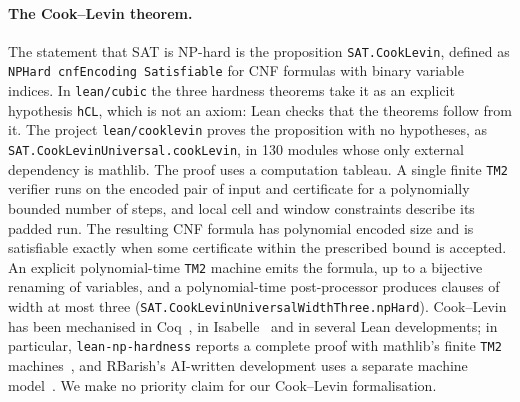 \documentclass[11pt,letterpaper]{article}
\theoremstyle{definition}
\theoremstyle{remark}
\newcommand{\lean}[1]{\texttt{#1}}
\begin{document}
\paragraph{The Cook--Levin theorem.}
The statement that SAT is NP-hard is the proposition \lean{SAT.CookLevin}, defined as
\lean{NPHard cnfEncoding Satisfiable} for CNF formulas with binary variable indices. In
\lean{lean/cubic} the three hardness theorems take it as an explicit hypothesis \lean{hCL}, which is
not an axiom: Lean checks that the theorems follow from it. The project \lean{lean/cooklevin} proves
the proposition with no hypotheses, as \lean{SAT.CookLevinUniversal.cookLevin}, in 130 modules whose
only external dependency is mathlib. The proof uses a computation tableau. A single finite
\lean{TM2} verifier runs on the encoded pair of input and certificate for a polynomially bounded
number of steps, and local cell and window constraints describe its padded run. The resulting CNF
formula has polynomial encoded size and is satisfiable exactly when some certificate within the
prescribed bound is accepted. An explicit polynomial-time \lean{TM2} machine emits the formula, up to
a bijective renaming of variables, and a polynomial-time post-processor produces clauses of width at
most three (\lean{SAT.CookLevinUniversalWidthThree.npHard}). Cook--Levin has been mechanised in
Coq~\cite{GK21}, in Isabelle~\cite{Balbach23} and in several Lean developments; in particular,
\lean{lean-np-hardness} reports a complete proof with mathlib's finite \lean{TM2}
machines~\cite{Solresol26}, and RBarish's AI-written development uses a separate machine
model~\cite{RBarish26}. We make no priority claim for our Cook--Levin formalisation.
\end{document}
